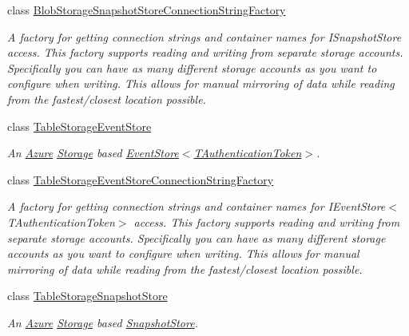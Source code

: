 \begin{DoxyCompactItemize}
class \hyperlink{classCqrs_1_1Azure_1_1BlobStorage_1_1Events_1_1BlobStorageSnapshotStoreConnectionStringFactory}{Blob\+Storage\+Snapshot\+Store\+Connection\+String\+Factory}
\begin{DoxyCompactList}\small\item\em A factory for getting connection strings and container names for I\+Snapshot\+Store access. This factory supports reading and writing from separate storage accounts. Specifically you can have as many different storage accounts as you want to configure when writing. This allows for manual mirroring of data while reading from the fastest/closest location possible. \end{DoxyCompactList}\item 
class \hyperlink{classCqrs_1_1Azure_1_1BlobStorage_1_1Events_1_1TableStorageEventStore}{Table\+Storage\+Event\+Store}
\begin{DoxyCompactList}\small\item\em An \hyperlink{namespaceCqrs_1_1Azure}{Azure} \hyperlink{namespaceCqrs_1_1Azure_1_1Storage}{Storage} based \hyperlink{classCqrs_1_1Events_1_1EventStore_a6346cb2aea4c5b4e740dc6cfb15abab8_a6346cb2aea4c5b4e740dc6cfb15abab8}{Event\+Store$<$\+T\+Authentication\+Token$>$}. \end{DoxyCompactList}\item 
class \hyperlink{classCqrs_1_1Azure_1_1BlobStorage_1_1Events_1_1TableStorageEventStoreConnectionStringFactory}{Table\+Storage\+Event\+Store\+Connection\+String\+Factory}
\begin{DoxyCompactList}\small\item\em A factory for getting connection strings and container names for I\+Event\+Store$<$\+T\+Authentication\+Token$>$ access. This factory supports reading and writing from separate storage accounts. Specifically you can have as many different storage accounts as you want to configure when writing. This allows for manual mirroring of data while reading from the fastest/closest location possible. \end{DoxyCompactList}\item 
class \hyperlink{classCqrs_1_1Azure_1_1BlobStorage_1_1Events_1_1TableStorageSnapshotStore}{Table\+Storage\+Snapshot\+Store}
\begin{DoxyCompactList}\small\item\em An \hyperlink{namespaceCqrs_1_1Azure}{Azure} \hyperlink{namespaceCqrs_1_1Azure_1_1Storage}{Storage} based \hyperlink{classCqrs_1_1Snapshots_1_1SnapshotStore_aa8ab186f864443c7d9647a4522864a84_aa8ab186f864443c7d9647a4522864a84}{Snapshot\+Store}. \end{DoxyCompactList}\item 

\end{DoxyCompactItemize}
